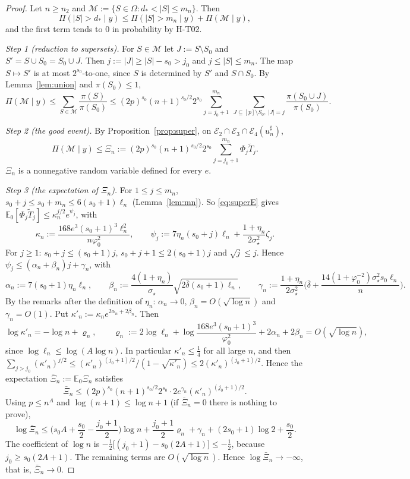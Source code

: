 \documentclass[11pt]{article}
\theoremstyle{remark}
\newcommand{\E}{\mathbb E}
\newcommand{\sst}{\sigma_\star}
\begin{document}
\begin{proof}
Let $n\ge n_2$ and $\mathcal M:=\{S\in\Omega:d_\ast<|S|\le m_n\}$. Then
\begin{equation}\label{eq:split}
\Pi(|S|>d_\ast\mid y)\le\Pi(|S|>m_n\mid y)+\Pi(\mathcal M\mid y),
\end{equation}
and the first term tends to $0$ in probability by H-T02.

\emph{Step 1 (reduction to supersets).} For $S\in\mathcal M$ let $J:=S\setminus S_0$ and $S'=S\cup S_0=S_0\cup J$. Then $j:=|J|\ge|S|-s_0>j_0$ and $j\le|S|\le m_n$. The map $S\mapsto S'$ is at most $2^{s_0}$-to-one, since $S$ is determined by $S'$ and $S\cap S_0$. By Lemma~\ref{lem:union} and $\pi(S_0)\le1$,
\[
\Pi(\mathcal M\mid y)\le\sum_{S\in\mathcal M}\frac{\pi(S)}{\pi(S_0)}\le(2p)^{s_0}(n+1)^{s_0/2}2^{s_0}\sum_{j=j_0+1}^{m_n}\ \sum_{J\subseteq[p]\setminus S_0,\ |J|=j}\frac{\pi(S_0\cup J)}{\pi(S_0)} .
\]

\emph{Step 2 (the good event).} By Proposition~\ref{prop:super}, on $\mathcal E_2\cap\mathcal E_3\cap\mathcal E_4(u_n^\sharp)$,
\[
\Pi(\mathcal M\mid y)\le\Xi_n:=(2p)^{s_0}(n+1)^{s_0/2}2^{s_0}\sum_{j=j_0+1}^{m_n}\Phi_j\tilde T_j .
\]
$\Xi_n$ is a nonnegative random variable defined for every $e$.

\emph{Step 3 (the expectation of $\Xi_n$).} For $1\le j\le m_n$, $s_0+j\le s_0+m_n\le6(s_0+1)\ell_n$ (Lemma~\ref{lem:mn}). So \eqref{eq:superE} gives $\E_0[\Phi_j\tilde T_j]\le\kappa_n^{j/2}e^{\psi_j}$, with
\[
\kappa_n:=\frac{168e^3(s_0+1)^3\ell_n^2}{n\varphi_0^2},\qquad \psi_j:=7\eta_n(s_0+j)\ell_n+\frac{1+\eta_n}{2\sst^2}\zeta_j .
\]
For $j\ge1$: $s_0+j\le(s_0+1)j$, $s_0+j+1\le2(s_0+1)j$ and $\sqrt j\le j$. Hence $\psi_j\le(\alpha_n+\beta_n)j+\gamma_n$, with
\[
\alpha_n:=7(s_0+1)\eta_n\ell_n,\qquad \beta_n:=\frac{4(1+\eta_n)}{\sst}\sqrt{2\bar\delta(s_0+1)\ell_n},\qquad \gamma_n:=\frac{1+\eta_n}{2\sst^2}\Big(\bar\delta+\frac{14(1+\varphi_0^{-2})\sst^2s_0\ell_n}{n}\Big).
\]
By the remarks after the definition of $\eta_n$: $\alpha_n\to0$, $\beta_n=O(\sqrt{\log n})$ and $\gamma_n=O(1)$. Put $\kappa'_n:=\kappa_ne^{2\alpha_n+2\beta_n}$. Then
\[
\log\kappa'_n=-\log n+\varrho_n,\qquad \varrho_n:=2\log\ell_n+\log\frac{168e^3(s_0+1)^3}{\varphi_0^2}+2\alpha_n+2\beta_n=O(\sqrt{\log n}),
\]
since $\log\ell_n\le\log(A\log n)$. In particular $\kappa'_n\le\frac14$ for all large $n$, and then $\sum_{j>j_0}(\kappa'_n)^{j/2}\le(\kappa'_n)^{(j_0+1)/2}/(1-\sqrt{\kappa'_n})\le2(\kappa'_n)^{(j_0+1)/2}$. Hence the expectation $\bar\Xi_n:=\E_0\Xi_n$ satisfies
\[
\bar\Xi_n\le(2p)^{s_0}(n+1)^{s_0/2}2^{s_0}\cdot2e^{\gamma_n}(\kappa'_n)^{(j_0+1)/2}.
\]
Using $p\le n^A$ and $\log(n+1)\le\log n+1$ (if $\bar\Xi_n=0$ there is nothing to prove),
\[
\log\bar\Xi_n\le\Big(s_0A+\frac{s_0}2-\frac{j_0+1}2\Big)\log n+\frac{j_0+1}2\varrho_n+\gamma_n+(2s_0+1)\log2+\frac{s_0}2 .
\]
The coefficient of $\log n$ is $-\frac12\big[(j_0+1)-s_0(2A+1)\big]\le-\frac12$, because $j_0\ge s_0(2A+1)$. The remaining terms are $O(\sqrt{\log n})$. Hence $\log\bar\Xi_n\to-\infty$, that is, $\bar\Xi_n\to0$.


\end{proof}
\end{document}
